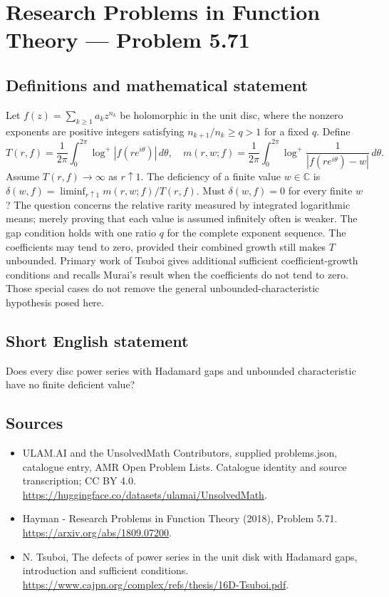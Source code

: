 \documentclass[11pt,a4paper]{article}
\begin{document}
\section*{Research Problems in Function Theory — Problem 5.71}\label{statement}

\subsection{Definitions and mathematical statement}
Let $f(z)=\sum_{k\ge1}a_kz^{n_k}$ be holomorphic in the unit disc, where the nonzero exponents are positive integers satisfying $n_{k+1}/n_k\ge q>1$ for a fixed $q$. Define
\[
T(r,f)=\frac1{2\pi}\int_0^{2\pi}\log^+|f(re^{i\theta})|\,d\theta,
\quad
m(r,w;f)=\frac1{2\pi}\int_0^{2\pi}
\log^+\frac1{|f(re^{i\theta})-w|}\,d\theta.
\]
Assume $T(r,f)\to\infty$ as $r\uparrow1$. The deficiency of a finite value $w\in\mathbb C$ is
$\delta(w,f)=\liminf_{r\uparrow1}m(r,w;f)/T(r,f)$.
Must $\delta(w,f)=0$ for every finite $w$?
The question concerns the relative rarity measured by integrated logarithmic means; merely proving that each value is assumed infinitely often is weaker. The gap condition holds with one ratio $q$ for the complete exponent sequence. The coefficients may tend to zero, provided their combined growth still makes $T$ unbounded.
Primary work of Tsuboi gives additional sufficient coefficient-growth conditions and recalls Murai's result when the coefficients do not tend to zero. Those special cases do not remove the general unbounded-characteristic hypothesis posed here.
\subsection{Short English statement}
Does every disc power series with Hadamard gaps and unbounded characteristic have no finite deficient value?
\subsection{Sources}
\begin{itemize}
\item[S1] ULAM.AI and the UnsolvedMath Contributors, supplied problems.json, catalogue entry, AMR Open Problem Lists. Catalogue identity and source transcription; CC BY 4.0.
\url{https://huggingface.co/datasets/ulamai/UnsolvedMath}.
\item[S2] Hayman - Research Problems in Function Theory (2018), Problem 5.71. 
\url{https://arxiv.org/abs/1809.07200}.
\item[S3] N. Tsuboi, The defects of power series in the unit disk with Hadamard gaps, introduction and sufficient conditions.
\url{https://www.cajpn.org/complex/refs/thesis/16D-Tsuboi.pdf}.
\end{itemize}
\end{document}
